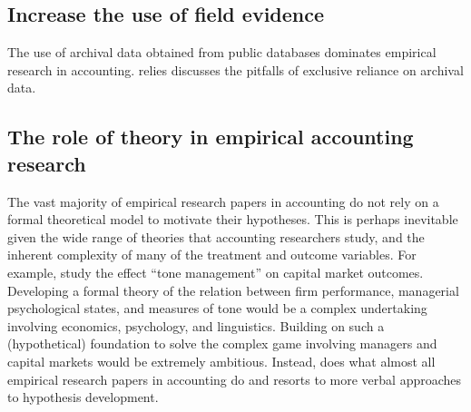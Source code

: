 \documentclass[11pt]{amsart}
\begin{document}
\subsection{Increase the use of field evidence}

The use of archival data obtained from public databases dominates empirical research in accounting. relies \cite{Soltes:2014gr} discusses the pitfalls of exclusive reliance on archival data. 


\subsection{The role of theory in empirical accounting research}
The vast majority of empirical research papers in accounting do not rely on a formal theoretical model to motivate their hypotheses.
This is perhaps inevitable given the wide range of theories that accounting researchers study, and the inherent complexity of many of the treatment and outcome variables.
For example, \citet{Huang:2014cs} study the effect ``tone management'' on capital market outcomes.
Developing a formal theory of the relation between firm performance, managerial psychological states, and measures of tone would be a complex undertaking involving economics, psychology, and linguistics.
Building on such a (hypothetical) foundation to solve the complex game involving managers and capital markets would be extremely ambitious.
Instead, \citet{Huang:2014cs} does what almost all empirical research papers in accounting do and resorts to more verbal approaches to hypothesis development. 


\clearpage


\clearpage



\clearpage

\end{document}
